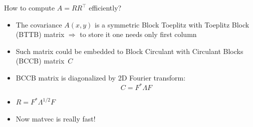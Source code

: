 \documentclass[12pt]{beamer}
\begin{document}
\begin{frame}{How to compute $A = RR^{\top}$ efficiently?}

\begin{itemize}
\item The covariance $A(x, y)$ is a symmetric Block Toeplitz with Toeplitz Block (BTTB) matrix $\Rightarrow$ to store it one needs only first column
\item Such matrix could be embedded to Block Circulant with Circulant Blocks (BCCB) matrix~$C$
\item BCCB matrix is diagonalized by 2D Fourier transform: 
\[
C = F^*\Lambda F
\]
\item $R = F^* \Lambda^{1/2} F$ 
\item Now matvec is really fast!
\end{itemize}

\end{frame}
\end{document}
